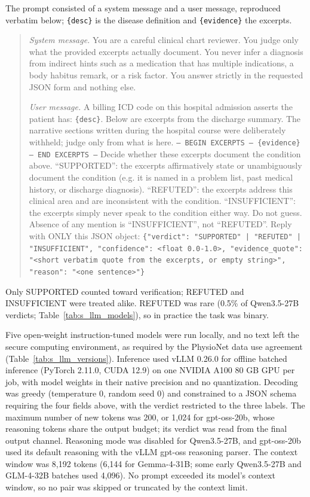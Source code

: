 \documentclass[unnumsec,webpdf,contemporary,large]{oup-authoring-template}
\begin{document}
The prompt consisted of a system message and a user message, reproduced verbatim below; \texttt{\{desc\}} is the disease definition and \texttt{\{evidence\}} the excerpts.

\begin{quote}
\small\raggedright
\textit{System message.} You are a careful clinical chart reviewer. You judge only what the provided excerpts actually document. You never infer a diagnosis from indirect hints such as a medication that has multiple indications, a body habitus remark, or a risk factor. You answer strictly in the requested JSON form and nothing else.

\smallskip
\textit{User message.} A billing ICD code on this hospital admission asserts the patient has: \texttt{\{desc\}}. Below are excerpts from the discharge summary. The narrative sections written during the hospital course were deliberately withheld; judge only from what is here. \texttt{--- BEGIN EXCERPTS --- \{evidence\} --- END EXCERPTS ---} Decide whether these excerpts document the condition above. ``SUPPORTED'': the excerpts affirmatively state or unambiguously document the condition (e.g. it is named in a problem list, past medical history, or discharge diagnosis). ``REFUTED'': the excerpts address this clinical area and are inconsistent with the condition. ``INSUFFICIENT'': the excerpts simply never speak to the condition either way. Do not guess. Absence of any mention is ``INSUFFICIENT'', not ``REFUTED''. Reply with ONLY this JSON object: \texttt{\{"verdict": "SUPPORTED" | "REFUTED" | "INSUFFICIENT", "confidence": <float 0.0-1.0>, "evidence\_quote": "<short verbatim quote from the excerpts, or empty string>", "reason": "<one sentence>"\}}
\end{quote}

Only SUPPORTED counted toward verification; REFUTED and INSUFFICIENT were treated alike. REFUTED was rare (0.5\% of Qwen3.5-27B verdicts; Table~\ref{tab:s_llm_models}), so in practice the task was binary.

Five open-weight instruction-tuned models were run locally, and no text left the secure computing environment, as required by the PhysioNet data use agreement (Table~\ref{tab:s_llm_versions}). Inference used vLLM 0.26.0 for offline batched inference (PyTorch 2.11.0, CUDA 12.9) on one NVIDIA A100 80 GB GPU per job, with model weights in their native precision and no quantization. Decoding was greedy (temperature 0, random seed 0) and constrained to a JSON schema requiring the four fields above, with the verdict restricted to the three labels. The maximum number of new tokens was 200, or 1,024 for gpt-oss-20b, whose reasoning tokens share the output budget; its verdict was read from the final output channel. Reasoning mode was disabled for Qwen3.5-27B, and gpt-oss-20b used its default reasoning with the vLLM gpt-oss reasoning parser. The context window was 8,192 tokens (6,144 for Gemma-4-31B; some early Qwen3.5-27B and GLM-4-32B batches used 4,096). No prompt exceeded its model's context window, so no pair was skipped or truncated by the context limit.
\end{document}
